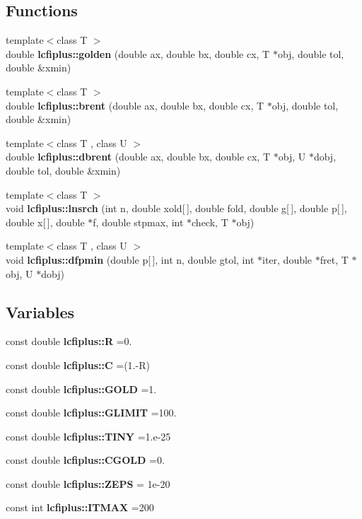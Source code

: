 \subsection*{Functions}
\begin{DoxyCompactItemize}
\item 
{\footnotesize template$<$class T $>$ }\\double {\bf lcfiplus\-::golden} (double ax, double bx, double cx, T $\ast$obj, double tol, double \&xmin)
\item 
{\footnotesize template$<$class T $>$ }\\double {\bf lcfiplus\-::brent} (double ax, double bx, double cx, T $\ast$obj, double tol, double \&xmin)
\item 
{\footnotesize template$<$class T , class U $>$ }\\double {\bf lcfiplus\-::dbrent} (double ax, double bx, double cx, T $\ast$obj, U $\ast$dobj, double tol, double \&xmin)
\item 
{\footnotesize template$<$class T $>$ }\\void {\bf lcfiplus\-::lnsrch} (int n, double xold[$\,$], double fold, double g[$\,$], double p[$\,$], double x[$\,$], double $\ast$f, double stpmax, int $\ast$check, T $\ast$obj)
\item 
{\footnotesize template$<$class T , class U $>$ }\\void {\bf lcfiplus\-::dfpmin} (double p[$\,$], int n, double gtol, int $\ast$iter, double $\ast$fret, T $\ast$obj, U $\ast$dobj)
\end{DoxyCompactItemize}
\subsection*{Variables}
\begin{DoxyCompactItemize}
\item 
const double {\bf lcfiplus\-::\-R} =0.
\item 
const double {\bf lcfiplus\-::\-C} =(1.-\/R)
\item 
const double {\bf lcfiplus\-::\-G\-O\-L\-D} =1.
\item 
const double {\bf lcfiplus\-::\-G\-L\-I\-M\-I\-T} =100.
\item 
const double {\bf lcfiplus\-::\-T\-I\-N\-Y} =1.e-\/25
\item 
const double {\bf lcfiplus\-::\-C\-G\-O\-L\-D} =0.
\item 
const double {\bf lcfiplus\-::\-Z\-E\-P\-S} = 1e-\/20
\item 
const int {\bf lcfiplus\-::\-I\-T\-M\-A\-X} =200
\end{DoxyCompactItemize}


